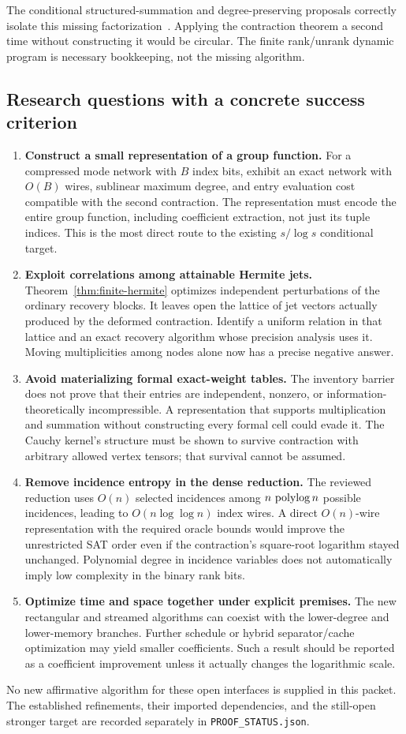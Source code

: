 The conditional structured-summation and degree-preserving proposals
correctly isolate this missing factorization~\cite{precision,scalar,analysis}.
Applying the contraction theorem a second time without constructing
it would be circular. The finite rank/unrank dynamic program is
necessary bookkeeping, not the missing algorithm.

\subsection{Research questions with a concrete success criterion}

\begin{enumerate}
\item \textbf{Construct a small representation of a group function.}
For a compressed mode network with $B$ index bits, exhibit an exact
network with $O(B)$ wires, sublinear maximum degree, and entry evaluation
cost compatible with the second contraction. The representation must
encode the entire group function, including coefficient extraction,
not just its tuple indices. This is the most direct route to the
existing $s/\log s$ conditional target.

\item \textbf{Exploit correlations among attainable Hermite jets.}
Theorem~\ref{thm:finite-hermite} optimizes independent perturbations
of the ordinary recovery blocks. It leaves open the lattice of jet
vectors actually produced by the deformed contraction. Identify a
uniform relation in that lattice and an exact recovery algorithm
whose precision analysis uses it. Moving multiplicities among nodes
alone now has a precise negative answer.

\item \textbf{Avoid materializing formal exact-weight tables.}
The inventory barrier does not prove that their entries are independent,
nonzero, or information-theoretically incompressible. A representation
that supports multiplication and summation without constructing every
formal cell could evade it. The Cauchy kernel's structure must be shown
to survive contraction with arbitrary allowed vertex tensors; that
survival cannot be assumed.

\item \textbf{Remove incidence entropy in the dense reduction.}
The reviewed reduction uses $O(n)$ selected incidences among
$n\,\operatorname{polylog} n$ possible incidences, leading to $O(n\log\log n)$
index wires. A direct $O(n)$-wire representation with the required
oracle bounds would improve the unrestricted SAT order even if the
contraction's square-root logarithm stayed unchanged. Polynomial degree
in incidence variables does not automatically imply low complexity in
the binary rank bits.

\item \textbf{Optimize time and space together under explicit premises.}
The new rectangular and streamed algorithms can coexist with the
lower-degree and lower-memory branches. Further schedule or hybrid
separator/cache optimization may yield smaller coefficients.
Such a result should be reported as a coefficient improvement unless
it actually changes the logarithmic scale.
\end{enumerate}

No new affirmative algorithm for these open interfaces is supplied in
this packet. The established refinements, their imported dependencies,
and the still-open stronger target are recorded separately in
\texttt{PROOF\_STATUS.json}.
